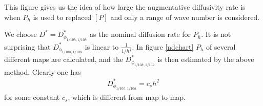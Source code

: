 This figure gives us the idea of how large the augmentative
diffusivity rate is when $P_h$ is used to replaced $[P]$ and only a
range of wave number is considered.

We choose $D^* = D^*_{\phi_{1/10h,1/10h}}$ as the nominal diffusion
rate for $P_h$. It is not surprising that $D^*_{\phi_{1/10h,1/10h}}$
is linear to $\frac{1}{1/h^2}$. In figure \ref{ndchart} $P_h$ of
several different maps are calculated, and the
$D^*_{\phi_{1/10h,1/10h}}$ is then estimated by the above method.
Clearly one has
\begin{eqnarray}
\label{MPphi} D^*_{\phi_{1/10h,1/10h}} = c_s h^2
\end{eqnarray}
for some constant $c_s$, which is different from map to map.






